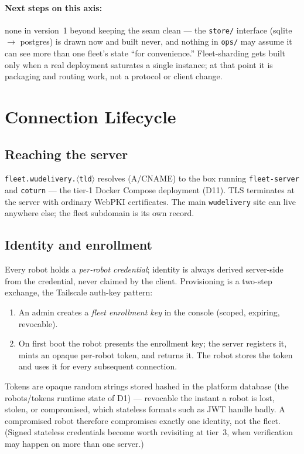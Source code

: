 \documentclass[11pt]{article}
\begin{document}
\paragraph{Next steps on this axis:} none in version~1 beyond keeping the seam clean
--- the \texttt{store/} interface (sqlite $\to$ postgres) is drawn now and built
never, and nothing in \texttt{ops/} may assume it can see more than one fleet's state
``for convenience.'' Fleet-sharding gets built only when a real deployment saturates a
single instance; at that point it is packaging and routing work, not a protocol or
client change.

\section{Connection Lifecycle}

\subsection{Reaching the server}

\texttt{fleet.wudelivery.}$\langle$\texttt{tld}$\rangle$ resolves (A/CNAME) to the box
running \texttt{fleet-server} and \texttt{coturn} --- the tier-1 Docker Compose
deployment (D11). TLS terminates at the server with ordinary WebPKI certificates. The
main \texttt{wudelivery} site can live anywhere else; the fleet subdomain is its own
record.

\subsection{Identity and enrollment}

Every robot holds a \emph{per-robot credential}; identity is always derived
server-side from the credential, never claimed by the client. Provisioning is a
two-step exchange, the Tailscale auth-key pattern:

\begin{enumerate}[itemsep=1pt]
  \item An admin creates a \emph{fleet enrollment key} in the console (scoped,
        expiring, revocable).
  \item On first boot the robot presents the enrollment key; the server registers it,
        mints an opaque per-robot token, and returns it. The robot stores the token
        and uses it for every subsequent connection.
\end{enumerate}

Tokens are opaque random strings stored hashed in the platform database (the
robots/tokens runtime state of D1) --- revocable the instant a robot is lost, stolen,
or compromised, which stateless formats such as JWT handle badly. A compromised robot
therefore compromises exactly one identity, not the fleet. (Signed stateless
credentials become worth revisiting at tier~3, when verification may happen on more
than one server.)
\end{document}
